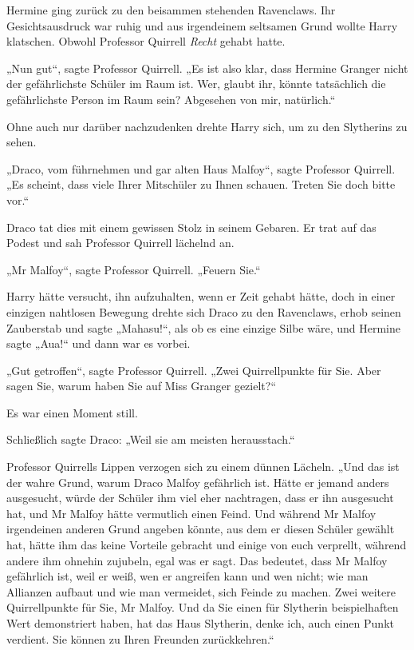 {Hermine ging zurück zu den beisammen stehenden Ravenclaws. Ihr Gesichtsausdruck war ruhig und aus irgendeinem seltsamen Grund wollte Harry klatschen. Obwohl Professor Quirrell \emph{Recht} gehabt hatte.

„Nun gut“, sagte Professor Quirrell. „Es ist also klar, dass Hermine Granger nicht der gefährlichste Schüler im Raum ist. Wer, glaubt ihr, könnte tatsächlich die gefährlichste Person im Raum sein? Abgesehen von mir, natürlich.“

Ohne auch nur darüber nachzudenken drehte Harry sich, um zu den Slytherins zu sehen.

„Draco, vom führnehmen und gar alten Haus Malfoy“, sagte Professor Quirrell. „Es scheint, dass viele Ihrer Mitschüler zu Ihnen schauen. Treten Sie doch bitte vor.“

Draco tat dies mit einem gewissen Stolz in seinem Gebaren. Er trat auf das Podest und sah Professor Quirrell lächelnd an.

„Mr Malfoy“, sagte Professor Quirrell. „Feuern Sie.“

Harry hätte versucht, ihn aufzuhalten, wenn er Zeit gehabt hätte, doch in einer einzigen nahtlosen Bewegung drehte sich Draco zu den Ravenclaws, erhob seinen Zauberstab und sagte „Mahasu!“, als ob es eine einzige Silbe wäre, und Hermine sagte „Aua!“ und dann war es vorbei.

„Gut getroffen“, sagte Professor Quirrell. „Zwei Quirrellpunkte für Sie. Aber sagen Sie, warum haben Sie auf Miss Granger gezielt?“

Es war einen Moment still.

Schließlich sagte Draco: „Weil sie am meisten herausstach.“

Professor Quirrells Lippen verzogen sich zu einem dünnen Lächeln. „Und das ist der wahre Grund, warum Draco Malfoy gefährlich ist. Hätte er jemand anders ausgesucht, würde der Schüler ihm viel eher nachtragen, dass er ihn ausgesucht hat, und Mr Malfoy hätte vermutlich einen Feind. Und während Mr Malfoy irgendeinen anderen Grund angeben könnte, aus dem er diesen Schüler gewählt hat, hätte ihm das keine Vorteile gebracht und einige von euch verprellt, während andere ihm ohnehin zujubeln, egal was er sagt. Das bedeutet, dass Mr Malfoy gefährlich ist, weil er weiß, wen er angreifen kann und wen nicht; wie man Allianzen aufbaut und wie man vermeidet, sich Feinde zu machen. Zwei weitere Quirrellpunkte für Sie, Mr Malfoy. Und da Sie einen für Slytherin beispielhaften Wert demonstriert haben, hat das Haus Slytherin, denke ich, auch einen Punkt verdient. Sie können zu Ihren Freunden zurückkehren.“

}
